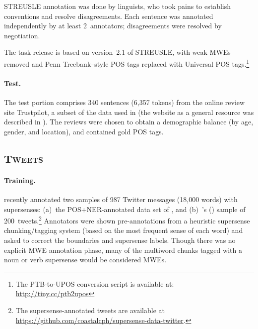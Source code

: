\documentclass[11pt,letterpaper]{article}
\newcommand{\citeposs}[1]{\citeauthor{#1}'s (\citeyear{#1})}
\newcommand{\ensuretext}[1]{#1}
\newcommand{\nssmarker}{\ensuretext{\textcolor{magenta}{\ensuremath{^{\textsc{NS}}_{\textsc{S}}}}}}
\newcommand{\arkcomment}[3]{\ensuretext{\textcolor{#3}{[#1 #2]}}}
\newcommand{\nss}[1]{\arkcomment{\nssmarker}{#1}{magenta}}
\newcommand{\dataset}[1]{\mbox{\textsc{#1}}}	%
\newcommand{\finalversion}[1]{}
\newcommand{\longversion}[1]{#1} %
\begin{document}
STREUSLE annotation was done by linguists, who took pains to establish conventions and resolve disagreements.
Each sentence was annotated independently by at least 2~annotators; disagreements were resolved by negotiation. 

The task release is based on version~2.1 of STREUSLE, with weak MWEs removed
and Penn Treebank--style POS tags replaced with Universal POS tags.\footnote{The PTB-to-UPOS conversion script is available at:
\mbox{\url{http://tiny.cc/ptb2upos}}} 


\paragraph{Test.}
The test portion comprises 340 sentences (6,357 tokens) from the online review site Trustpilot, a subset of the data used in \citet{hovy-2015age} 
(the website as a general resource was described in \citet{hovy-2015trustpilot}). 
The reviews were chosen to obtain a demographic balance (by age, gender, and location), and contained gold POS tags. 

\subsection{\dataset{Tweets}}\label{sec:tweets} 
\paragraph{Training.}
\citet{johannsen-14} recently annotated two samples of 987 Twitter messages (18,000 words) 
with supersenses\longversion{: 
(a)~the POS+NER-annotated data set of \citet{ritter-11}, 
and 
(b)~\citeposs{plank-14} sample of 200~tweets}.\footnote{The supersense-annotated tweets 
are available at \url{https://github.com/coastalcph/supersense-data-twitter}.}
Annotators were shown pre-annotations from a heuristic supersense chunking\slash tagging system%
\longversion{ (based on the most frequent sense of each word)}
and asked to correct the boundaries and supersense labels. 
Though there was no explicit MWE annotation phase, 
many of the multiword chunks tagged with a \longversion{noun or verb }supersense would be considered MWEs.\finalversion{\nss{POS?}}
\end{document}
